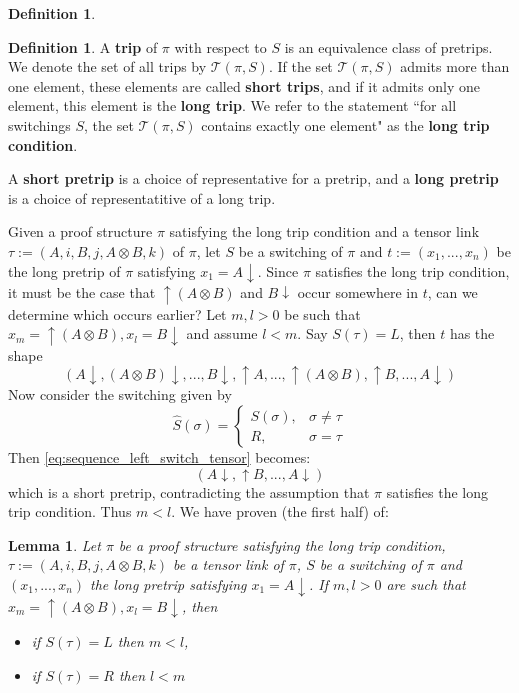 \documentclass[12pt]{article}
\theoremstyle{plain}
\newtheorem{lemma}[thm]{Lemma}
\theoremstyle{definition}
\newtheorem{defn}[thm]{Definition} %
\newcommand{\call}[1]{\mathcal{#1}}
\begin{document}
\begin{defn}
\begin{defn}
			A \textbf{trip} of $\pi$ with respect to $S$ is an equivalence class of pretrips. We denote the set of all trips by $\call{T}(\pi,S)$.  If the set $\call{T}(\pi,S)$ admits more than one element, these elements are called \textbf{short trips}, and if it admits only one element, this element is the \textbf{long trip}. We refer to the statement ``for all switchings $S$, the set $\call{T}(\pi,S)$ contains exactly one element" as the \textbf{long trip condition}.
			
			A \textbf{short pretrip} is a choice of representative for a pretrip, and a \textbf{long pretrip} is a choice of representatitive of a long trip.
		\end{defn}
		
	\end{defn}
	Given a proof structure $\pi$ satisfying the long trip condition and a tensor link $\tau := (A,i,B,j, A \otimes B,k)$ of $\pi$, let $S$ be a switching of $\pi$ and $t := (x_1,...,x_n)$ be the long pretrip of $\pi$ satisfying $x_1 =A\downarrow$. Since $\pi$ satisfies the long trip condition, it must be the case that $\uparrow (A \otimes B)$ and $B\downarrow$ occur somewhere in $t$, can we determine which occurs earlier? Let $m,l > 0$ be such that $x_m = \uparrow (A \otimes B), x_l = B\downarrow$ and assume $l < m$. Say $S(\tau) = L$, then $t$ has the shape
	\begin{equation}\label{eq:sequence_left_switch_tensor}
		(A\downarrow, (A \otimes B)\downarrow, ..., B \downarrow, \uparrow A, ..., \uparrow (A \otimes B), \uparrow B, ..., A\downarrow)
	\end{equation}
	Now consider the switching given by
	\[\hat{S}(\sigma) = \begin{cases}
		S(\sigma),& \sigma \neq \tau\\
		R, & \sigma = \tau
	\end{cases}
	\]
	Then \eqref{eq:sequence_left_switch_tensor} becomes:
	\begin{equation}
		(A\downarrow, \uparrow B, ..., A\downarrow)
	\end{equation}
	which is a short pretrip, contradicting the assumption that $\pi$ satisfies the long trip condition. Thus $m < l$. We have proven (the first half) of:
	\begin{lemma}\label{lem:stays_contained_tensor}
		Let $\pi$ be a proof structure satisfying the long trip condition, $\tau := (A,i,B,j, A \otimes B,k)$ be a tensor link of $\pi$, $S$ be a switching of $\pi$ and $(x_1,...,x_n)$ the long pretrip satisfying $x_1 = A \downarrow$. If $m,l > 0$ are such that $x_m = \uparrow (A \otimes B), x_l = B \downarrow$, then
		\begin{itemize}
			\item if $S(\tau) = L$ then $m < l$,
			\item if $S(\tau) = R$ then $l < m$
		\end{itemize}
	\end{lemma}
\end{document}
